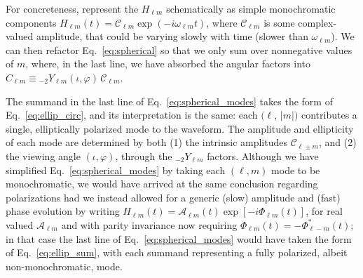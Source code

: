 \documentclass[aps,prd,twocolumn,superscriptaddress,preprintnumbers,floatfix,nofootinbib]{revtex4-2}
\newcommand*{\eq}[1]{Eq.~\eqref{eq:#1}}
\begin{document}
For concreteness, represent the $H_{\ell m}$ schematically as simple monochromatic components $H_{\ell m} (t) = \mathcal{C}_{\ell m} \exp\left(-i \omega_{\ell m} t\right)$, where $\mathcal{C}_{\ell m}$ is some complex-valued amplitude, that could be varying slowly with time (slower than $\omega_{\ell m}$).
We can then refactor Eq.~\eqref{eq:spherical} so that we only sum over nonnegative values of $m$,
where, in the last line, we have absorbed the angular factors into $C_{\ell m} \equiv {}_{-2}Y_{\ell m} (\iota, \varphi)\, \mathcal{C}_{\ell m}$.

The summand in the last line of \eq{spherical_modes} takes the form of \eq{ellip_circ}, and its interpretation is the same: each $(\ell$, $|m|)$ contributes a single, elliptically polarized mode to the waveform.
The amplitude and ellipticity of each mode are determined by both (1) the intrinsic amplitudes $\mathcal{C}_{\ell \pm m}$, and (2) the viewing angle $(\iota, \varphi)$, through the ${}_{-2} Y_{\ell m}$ factors.
Although we have simplified \eq{spherical_modes} by taking each $(\ell, m)$ mode to be monochromatic, we would have arrived at the same conclusion regarding polarizations had we instead allowed for a generic (slow) amplitude and (fast) phase evolution by writing $H_{\ell m}(t) = \mathcal{A}_{\ell m}(t) \exp[-i \Phi_{\ell m}(t)]$, for real valued $\mathcal{A}_{\ell m}$ and with parity invariance now requiring $\Phi_{\ell m}(t) = - \Phi_{\ell -m}^*(t)$; in that case the last line of \eq{spherical_modes} would have taken the form of \eq{ellip_sum}, with each summand representing a fully polarized, albeit non-monochromatic, mode.
\end{document}
